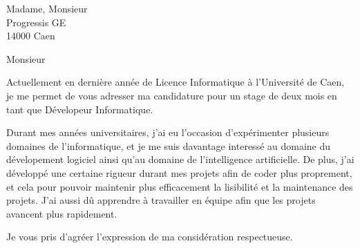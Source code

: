 \documentclass[12pt, a4paper]{lettre}
\makeatletter
\newcommand*{\noRule}{\renewcommand*{\rule@length}{0}}
\makeatother
\begin{document}
    
    \begin{letter}{Madame, Monsieur\\Progressis GE\\14000 Caen}
        \nolieu
        \nodate
        \noRule
        
        
        \opening{Monsieur}
            Actuellement en dernière année de Licence Informatique à l'Université de Caen, je me permet de vous adresser ma candidature pour un stage de deux mois en tant que Dévelopeur Informatique.
            
            \vspace{1em}
            
            Durant mes années universitaires, j'ai eu l'occasion d'expérimenter plusieurs domaines de l'informatique, et je me suis davantage interessé au domaine du dévelopement logiciel ainsi qu'au domaine de l'intelligence artificielle. De plus, j'ai développé une certaine rigueur durant mes projets afin de coder plus proprement, et cela pour pouvoir maintenir plus efficacement la lisibilité et la maintenance des projets. J'ai aussi dû apprendre à travailler en équipe afin que les projets avancent plus rapidement.
        
        \closing{Je vous pris d'agréer l'expression de ma considération respectueuse.}
    \end{letter}
    
\end{document}
